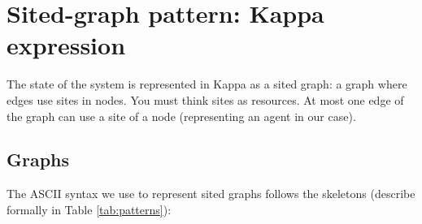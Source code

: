 \documentclass[11pt]{book}
\begin{document}
\section{Sited-graph pattern: Kappa expression}

The state of the system is represented in Kappa as a sited graph: a
graph where edges use sites in nodes. You must think
sites as resources. At most one edge of the graph can use a site of
a node (representing an agent in our case). %

\subsection{Graphs}
The ASCII syntax we use to represent sited graphs follows the
skeletons (describe formally in Table \ref{tab:patterns}):
\end{document}
